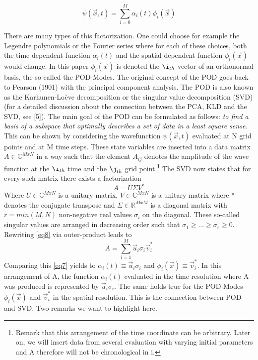 \documentclass[usenatbib]{mn2e}
\begin{document}
\begin{equation}\label{eq7}
\psi( \overrightarrow {x},t) = \sum_{i=0}^M \alpha_i(t) \phi_i(\overrightarrow{x}) 
\end{equation} 

There are many types of this factorization. One could choose for example the Legendre polynomials or the Fourier series where for each of these choices, both the time-dependent function \(\alpha_i(t)\) and the spatial dependent function \(\phi_i(\overrightarrow{x})\) would change. In this paper \(\phi_i(\overrightarrow{x})\) is denoted the \(\i_{th}\) vector of an orthonormal basis, the so called the POD-Modes. The original concept of the POD goes back to Pearson (1901) with the principal component analysis. The POD is also known as the Karhunen-Loève decomposition or the singular value decomposition (SVD) (for a detailed discussion about the connection between the PCA, KLD and the SVD, see [5]). The main goal of the POD can be formulated as follows: \textit{to find a basis of a subspace that optimally describes a set of data in a least square sense}. \\
This can be shown by considering the wavefunction  \(\psi( \overrightarrow {x},t)\) evaluated at N grid points and at M time steps. These state variables are inserted into a data matrix \(A \in \mathbb{C}^{MxN}\) in a way such that the element \(A_{ij}\) denotes the amplitude of the wave function at the \(\i_{th}\) time and the \(\j_{th}\) grid point.\footnote{Remark that this arrangement of the time coordinate can be arbitrary. Later on, we will insert data from several evaluation with varying initial parameters and A therefore will not be chronological in i.}
The SVD now states that for every such matrix there exists a factorization
\begin{equation}\label{eq8}
A=U\Sigma V^*
\end{equation} 
Where \(U \in \mathbb{C}^{MxN} \) is a unitary matrix, \(V \in \mathbb{C}^{MxN} \) is a unitary matrix where * denotes the conjugate transpose and \(\Sigma \in \mathbb{R}^{MxM} \) is a diagonal matrix with \(r=min(M,N)\) non-negative real values \(\sigma_i\) on the diagonal. These so-called singular values are arranged in decreasing order such that \(\sigma_1 \geq \dots \geq \sigma_r \geq 0\). Rewriting \ref{eq8} via outer-product leads to 
\begin{equation}\label{eq9}
A=\sum_{i=1}^M \overrightarrow{u}_i \sigma_i \overrightarrow{v}_i^*
\end{equation} 
Comparing this \ref{eq7} yields to \(\alpha_i(t) \equiv \overrightarrow{u}_i \sigma_i \) and \(\phi_i(\overrightarrow{x}) \equiv \overrightarrow{v}_i^*\). In this arrangement of A, the function \(\alpha_i(t)\) evaluated in the time resolution where A was produced is represented by \(\overrightarrow{u}_i \sigma_i \). The same holds true for the POD-Modes \(\phi_i(\overrightarrow{x})\) and \(\overrightarrow{v}_i^*\) in the spatial resolution. This is the connection between POD and SVD. Two remarks we want to highlight here.
\end{document}
